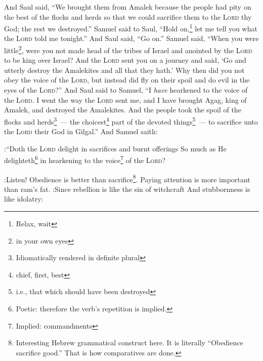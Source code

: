 \begin{enumerate}[align=center]
     And Saul said, ``We brought them from Amalek because the people had pity on the best of the flocks and herds so that we could sacrifice them to the \textsc{Lord} thy God; the rest we destroyed.''%
     Samuel said to Saul, ``Hold on,\footnote{Relax, wait} let me tell you what the \textsc{Lord} told me tonight.'' And Saul said, ``Go on.''%
     Samuel said, ``When you were little\footnote{in your own eyes}, were you not made head of the tribes of Israel and anointed by the \textsc{Lord} to be king over Israel?%
     And the \textsc{Lord} sent you on a journey and said, `Go and utterly destroy the Amalekites and all that they hath.'%
     Why then did you not obey the voice of the \textsc{Lord}, but instead did fly on their spoil and do evil in the eyes of the \textsc{Lord}?''%
     And Saul said to Samuel, ``I \emph{have} hearkened to the voice of the \textsc{Lord}. I went the way the \textsc{Lord} sent me, and I have brought Agag, king of Amalek, and destroyed the Amalekites.%
     And the people took the spoil of the flocks and herds\footnote{Idiomatically rendered in definite plural}~--- the choicest\footnote{chief, first, best} part of the devoted things\footnote{i.e., that which should have been destroyed}~--- to sacrifice unto the \textsc{Lord} their God in Gilgal.''%
     And Samuel saith:
    
:``Doth the \textsc{Lord} delight in sacrifices and burnt offerings So much as He delighteth\footnote{Poetic: therefore the verb's repetition is implied.} in hearkening to the voice\footnote{Implied: commandments} of the \textsc{Lord}?

:Listen! Obedience is better than sacrifice\footnote{Interesting Hebrew grammatical construct here. It is literally ``Obedience sacrifice good.'' That is how comparatives are done.}. Paying attention is more important than ram's fat.%
     :Since rebellion is like the sin of witchcraft And stubbornness is like idolatry:


\end{enumerate}
